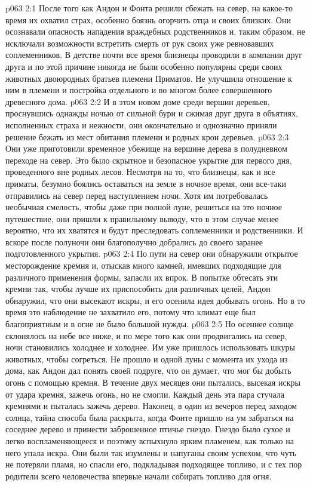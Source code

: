 \vs p063 2:1 После того как Андон и Фонта решили сбежать на север, на какое\hyp{}то время их охватил страх, особенно боязнь огорчить отца и своих близких. Они осознавали опасность нападения враждебных родственников и, таким образом, не исключали возможности встретить смерть от рук своих уже ревновавших соплеменников. В детстве почти все время близнецы проводили в компании друг друга и по этой причине никогда не были особенно популярны среди своих животных двоюродных братьев племени Приматов. Не улучшила отношение к ним в племени и постройка отдельного и во многом более совершенного древесного дома.
\vs p063 2:2 И в этом новом доме среди вершин деревьев, проснувшись однажды ночью от сильной бури и сжимая друг друга в объятиях, исполненных страха и нежности, они окончательно и однозначно приняли решение бежать из мест обитания племени и родных крон деревьев.
\vs p063 2:3 Они уже приготовили временное убежище на вершине дерева в полудневном переходе на север. Это было скрытное и безопасное укрытие для первого дня, проведенного вне родных лесов. Несмотря на то, что близнецы, как и все приматы, безумно боялись оставаться на земле в ночное время, они все\hyp{}таки отправились на север перед наступлением ночи. Хотя им потребовалась необычная смелость, чтобы даже при полной луне, решиться на это ночное путешествие, они пришли к правильному выводу, что в этом случае менее вероятно, что их хватятся и будут преследовать соплеменники и родственники. И вскоре после полуночи они благополучно добрались до своего заранее подготовленного укрытия.
\vs p063 2:4 По пути на север они обнаружили открытое месторождение кремня и, отыскав много камней, имевших подходящие для различного применения формы, запасли их впрок. В попытке обтесать эти кремни так, чтобы лучше их приспособить для различных целей, Андон обнаружил, что они высекают искры, и его осенила идея добывать огонь. Но в то время это наблюдение не захватило его, потому что климат еще был благоприятным и в огне не было большой нужды.
\vs p063 2:5 Но осеннее солнце склонялось на небе все ниже, и по мере того как они продвигались на север, ночи становились холоднее и холоднее. Им уже пришлось использовать шкуры животных, чтобы согреться. Не прошло и одной луны с момента их ухода из дома, как Андон дал понять своей подруге, что он думает, что мог бы добыть огонь с помощью кремня. В течение двух месяцев они пытались, высекая искры от удара кремня, зажечь огонь, но не смогли. Каждый день эта пара стучала кремнями и пыталась зажечь дерево. Наконец, в один из вечеров перед заходом солнца, тайна способа была раскрыта, когда Фонте пришло на ум забраться на соседнее дерево и принести заброшенное птичье гнездо. Гнездо было сухое и легко воспламеняющееся и поэтому вспыхнуло ярким пламенем, как только на него упала искра. Они были так изумлены и напуганы своим успехом, что чуть не потеряли пламя, но спасли его, подкладывая подходящее топливо, и с тех пор родители всего человечества впервые начали собирать топливо для огня.
